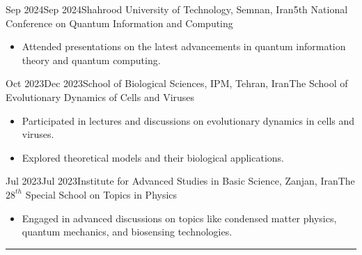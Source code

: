\documentclass[11pt, b4paper]{cv}
\begin{document}
\begin{school}{Sep 2024}{Sep 2024}{Shahrood University of Technology, Semnan, Iran}{5th National Conference on Quantum Information and Computing}
	\begin{itemize}
	    \item Attended presentations on the latest advancements in quantum information theory and quantum computing.
	\end{itemize}
\end{school}
\vspace{-0.1in}

\begin{school}{Oct 2023}{Dec 2023}{School of Biological Sciences, IPM, Tehran, Iran}{The School of Evolutionary Dynamics of Cells and Viruses}
	\begin{itemize}
	    \item Participated in lectures and discussions on evolutionary dynamics in cells and viruses.
	    \item Explored theoretical models and their biological applications.
	\end{itemize}
\end{school}
\vspace{-0.1in}

\begin{school}{Jul 2023}{Jul 2023}{Institute for Advanced Studies in Basic Science, Zanjan, Iran}{The $28^{th}$ Special School on Topics in Physics}
	\begin{itemize}
	    \item Engaged in advanced discussions on topics like condensed matter physics, quantum mechanics, and biosensing technologies.
	\end{itemize}
\end{school}



\vspace{-0.15in}
\rule{\textwidth}{1pt}\\
\vspace{-0.15in}
\end{document}
